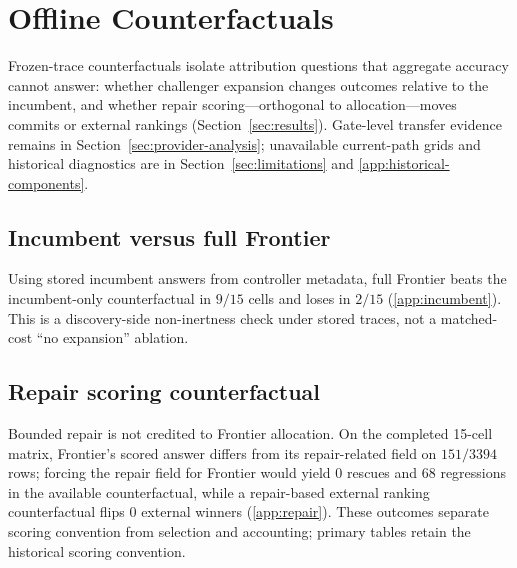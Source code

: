 \section{Offline Counterfactuals}
\label{sec:ablations}

Frozen-trace counterfactuals isolate attribution questions that aggregate accuracy cannot answer:
whether challenger expansion changes outcomes relative to the incumbent, and whether repair
scoring---orthogonal to allocation---moves commits or external rankings
(Section~\ref{sec:results}). Gate-level transfer evidence remains in
Section~\ref{sec:provider-analysis}; unavailable current-path grids and historical diagnostics are
in Section~\ref{sec:limitations} and \ref{app:historical-components}.

\subsection{Incumbent versus full Frontier}

Using stored incumbent answers from controller metadata, full Frontier beats the incumbent-only
counterfactual in $9/15$ cells and loses in $2/15$ (\ref{app:incumbent}). This is a
discovery-side non-inertness check under stored traces, not a matched-cost ``no expansion'' ablation.

\subsection{Repair scoring counterfactual}

Bounded repair is not credited to Frontier allocation. On the completed 15-cell matrix, Frontier's
scored answer differs from its repair-related field on $151/3394$ rows; forcing the repair field for
Frontier would yield 0 rescues and 68 regressions in the available counterfactual, while a
repair-based external ranking counterfactual flips 0 external winners (\ref{app:repair}).
These outcomes separate scoring convention from selection and accounting; primary tables retain the
historical scoring convention.
